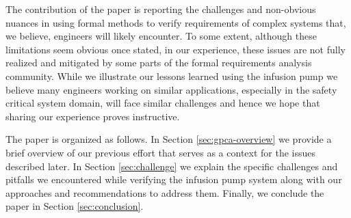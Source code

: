 The contribution of the paper is reporting the challenges and non-obvious nuances in using formal methods to verify requirements of complex systems that, we believe, engineers will likely encounter. To some extent, although these limitations seem obvious once stated, in our experience, these issues are not fully realized and mitigated by some parts of the formal requirements analysis community. While we illustrate our lessons learned using the infusion pump we believe many engineers working on similar applications, especially in the safety critical system domain, will face similar challenges and hence we hope that sharing our experience proves instructive.


The paper is organized as follows. In Section \ref{sec:gpca-overview} we provide a brief overview of our previous effort that serves as a context for the issues described later. In Section \ref{sec:challenge} we explain the specific challenges and pitfalls we encountered while verifying the infusion pump system along with our approaches and recommendations to address them. Finally, we conclude the paper in Section \ref{sec:conclusion}.
\iffalse


